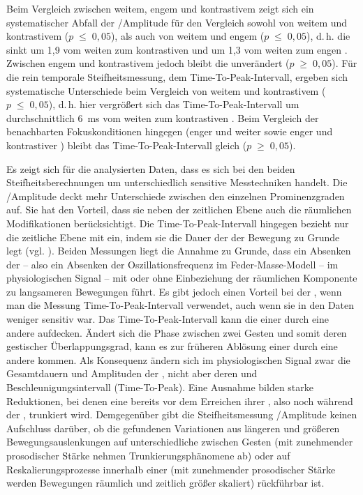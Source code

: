 Beim Vergleich zwischen weitem, engem und kontrastivem  zeigt sich ein systematischer Abfall der  /Amplitude für den Vergleich sowohl von weitem und kontrastivem  ($p\;\leq\;0,05$), als auch von weitem und engem  ($p\;\leq\;0,05$), d.\,h. die  sinkt um 1,9 vom weiten zum kontrastiven  und um 1,3 vom weiten zum engen . Zwischen engem und kontrastivem  jedoch bleibt die  unverändert ($p\;\geq\;0,05$). Für die rein temporale Steifheitsmessung, dem Time-To-Peak-Intervall, ergeben sich systematische Unterschiede beim Vergleich von weitem und kontrastivem  ($p\;\leq\;0,05$), d.\,h. hier vergrößert sich das Time-To-Peak-Intervall um durchschnittlich 6~ms vom weiten zum kontrastiven . Beim Vergleich der benachbarten Fokuskonditionen hingegen (enger und weiter  sowie enger und kontrastiver ) bleibt das Time-To-Peak-Intervall gleich ($p\;\geq\;0,05$).

 
Es zeigt sich für die analysierten Daten, dass es sich bei den beiden Steifheitsberechnungen um unterschiedlich sensitive Messtechniken handelt. Die  /Amplitude deckt mehr Unterschiede zwischen den einzelnen Prominenzgraden auf. Sie hat den Vorteil, dass sie neben der zeitlichen Ebene auch die räumlichen Modifikationen berücksichtigt. Die  Time-To-Peak-Intervall hingegen bezieht nur die zeitliche Ebene mit ein, indem sie die Dauer der  der Bewegung zu Grunde legt (vgl. \citealt{Cho2002a, Cho2006, Byrd1998}). Beiden Messungen liegt die Annahme zu Grunde, dass ein Absenken der  -- also ein Absenken der Oszillationsfrequenz im Feder-Masse-Modell -- im physiologischen Signal -- mit oder ohne Einbeziehung der räumlichen Komponente zu langsameren Bewegungen führt. Es gibt jedoch einen Vorteil bei der , wenn man die Messung Time-To-Peak-Intervall verwendet, auch wenn sie in den Daten weniger sensitiv war. Das Time-To-Peak-Intervall kann die  einer  durch eine andere aufdecken. Ändert sich die Phase zwischen zwei Gesten und somit deren gestischer Überlappungsgrad, kann es zur früheren Ablösung einer  durch eine andere kommen. Als Konsequenz ändern sich im physiologischen Signal zwar die Gesamtdauern und Amplituden der , nicht aber deren  und Beschleunigungsintervall (Time-To-Peak). Eine Ausnahme bilden starke Reduktionen, bei denen eine  bereits vor dem Erreichen ihrer , also noch während der , trunkiert wird. Demgegenüber gibt die Steifheitsmessung /Amplitude keinen Aufschluss darüber, ob die gefundenen Variationen aus längeren und größeren Bewegungsauslenkungen auf unterschiedliche  zwischen Gesten (mit zunehmender prosodischer Stärke nehmen Trunkierungsphänomene ab) oder auf Reskalierungsprozesse innerhalb einer  (mit zunehmender prosodischer Stärke werden Bewegungen räumlich und zeitlich größer skaliert) rückführbar ist.

